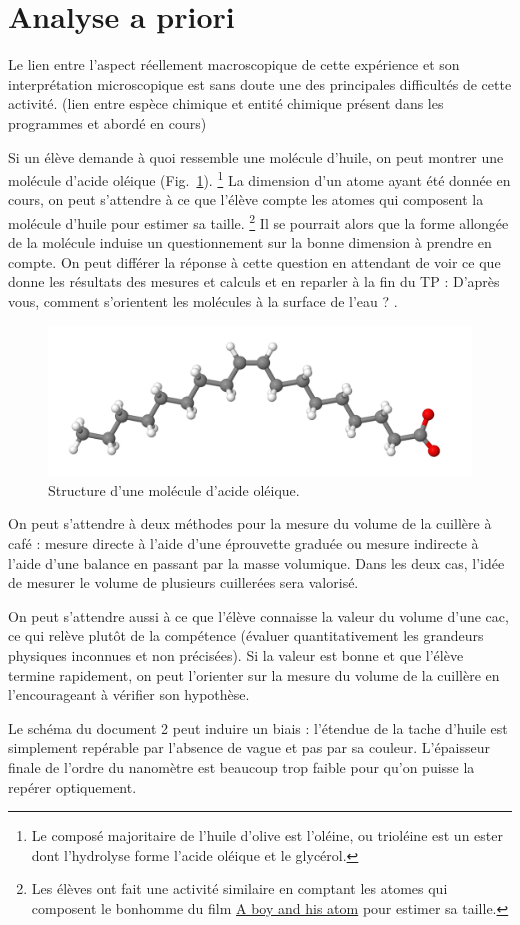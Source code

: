 \documentclass[12pt,a4paper]{article}
\begin{document}
\section{Analyse a priori}

Le lien entre l'aspect réellement macroscopique de cette expérience et son interprétation microscopique est sans doute une des principales difficultés de cette activité.
(lien entre espèce chimique et entité chimique présent dans les programmes et abordé en cours)

Si un élève demande à quoi ressemble une molécule d'huile, on peut montrer une molécule d'acide oléique (Fig.~\ref{fig:acide_oleique}).
\footnote{Le composé majoritaire de l'huile d'olive est l'oléine, ou trioléine est un ester dont l'hydrolyse forme l'acide oléique et le glycérol.}
La dimension d'un atome ayant été donnée en cours, on peut s'attendre à ce que l'élève compte les atomes qui composent la \og molécule d'huile \fg{} pour estimer sa taille.
\footnote{Les élèves ont fait une activité similaire en comptant les atomes qui composent le bonhomme du film \href{https://www.youtube.com/watch?v=oSCX78-8-q0}{A boy and his atom} pour estimer sa taille.}
Il se pourrait alors que la forme allongée de la molécule induise un questionnement sur la bonne dimension à prendre en compte.
On peut différer la réponse à cette question en attendant de voir ce que donne les résultats des mesures et calculs et en reparler à la fin du TP : \og D'après vous, comment s'orientent les molécules à la surface de l'eau ? \fg{}.

\begin{figure}
\center
\includegraphics[scale=0.4]{images/acide_oleique.png}
\caption{Structure d'une molécule d'acide oléique.}
\label{fig:acide_oleique}
\end{figure}

On peut s'attendre à deux méthodes pour la mesure du volume de la cuillère à café : mesure \og directe \fg{} à l'aide d'une éprouvette graduée ou mesure \og indirecte \fg{} à l'aide d'une balance en passant par la masse volumique.  
Dans les deux cas, l'idée de mesurer le volume de plusieurs cuillerées sera valorisé.

On peut s'attendre aussi à ce que l'élève connaisse la valeur du volume d'une cac, ce qui relève plutôt de la compétence \app{} (évaluer quantitativement les grandeurs physiques inconnues et non précisées).
Si la valeur est bonne et que l'élève termine rapidement, on peut l'orienter sur la mesure du volume de la cuillère en l'encourageant à vérifier son hypothèse.

Le schéma du document 2 peut induire un biais : l'étendue de la tache d'huile est simplement repérable par l'absence de vague et pas par sa couleur.
L'épaisseur finale de l'ordre du nanomètre est beaucoup trop faible pour qu'on puisse la repérer optiquement.
\end{document}
